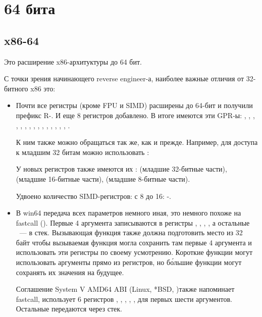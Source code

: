 \section{64 бита}

\subsection{x86-64}
\label{x86-64}

Это расширение x86-архитуктуры до 64 бит.

С точки зрения начинающего reverse engineer-а, наиболее важные отличия от 32-битного x86 это:

\myindex{\CLanguageElements!\Pointers}
\begin{itemize}

\item
Почти все регистры (кроме FPU и SIMD) расширены до 64-бит и получили префикс R-. 
И еще 8 регистров добавлено. 
В итоге имеются эти \ac{GPR}-ы:
 \RAX, \RBX, \RCX, \RDX, 
\RBP, \RSP, \RSI, \RDI, , , , 
, , , , . 

К ним также можно обращаться так же, как и прежде. Например, для доступа к младшим 32 битам \RAX 
можно использовать \EAX:


У новых регистров  также имеются их :  
(младшие 32-битные части), 
 (младшие 16-битные части),  (младшие 8-битные части).


Удвоено количество SIMD-регистров: с 8 до 16: -.

\item
В win64 передача всех параметров немного иная, это немного похоже на fastcall 
().
Первые 4 аргумента записываются в регистры \RCX, \RDX, , , а остальные ~--- в стек. 
Вызывающая функция также должна подготовить место из 32 байт чтобы вызываемая функция могла сохранить 
там первые 4 аргумента и использовать эти регистры по своему усмотрению. 
Короткие функции могут использовать аргументы прямо из регистров, но б\'{о}льшие функции могут сохранять 
их значения на будущее.

Соглашение System V AMD64 ABI (Linux, *BSD, \MacOSX)\SysVABI также напоминает
fastcall, использует 6 регистров 
\RDI, \RSI, \RDX, \RCX, ,  для первых шести аргументов.
Остальные передаются через стек.


\end{itemize}
